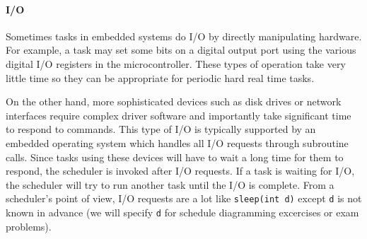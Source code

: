 \paragraph{I/O}
Sometimes tasks in embedded systems do I/O by directly manipulating
hardware. For example, a task may set some bits on a digital output
port using the various digital I/O registers in the microcontroller.  These types of operation  take
very little time so they can be appropriate for periodic hard real time tasks.


On the other hand, more sophisticated devices such as  disk drives or network
interfaces require complex driver
software and importantly take significant time to respond to commands.
This type of I/O is typically supported by an embedded operating system
which handles all I/O requests through subroutine calls.  Since tasks
using these devices will have to wait a long time for them to respond, the scheduler
is invoked after I/O requests.  If a task is waiting for I/O, the
scheduler will try to run another task until the I/O is complete.
From a scheduler's point of view, I/O requests are a lot like {\tt sleep(int d)} except {\tt d} is not known in advance (we will specify {\tt d} for schedule diagramming excercises or exam problems). 
%
%
%



